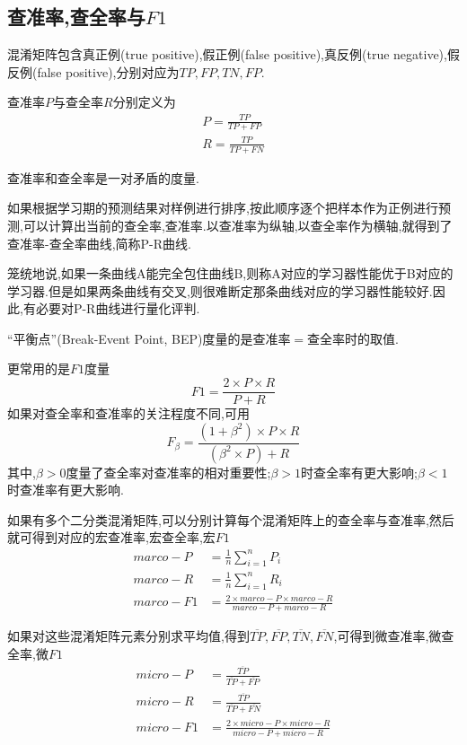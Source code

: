 \subsection{查准率,查全率与$F1$}

混淆矩阵包含真正例(true positive),假正例(false positive),真反例(true negative),假反例(false positive),分别对应为$TP,FP,TN,FP$.

查准率$P$与查全率$R$分别定义为
\begin{equation}\begin{split}
P=\frac{TP}{TP+FP}\\
R=\frac{TP}{TP+FN}
\end{split}\end{equation}

查准率和查全率是一对矛盾的度量.

如果根据学习期的预测结果对样例进行排序,按此顺序逐个把样本作为正例进行预测,可以计算出当前的查全率,查准率.以查准率为纵轴,以查全率作为横轴,就得到了查准率-查全率曲线,简称P-R曲线.

笼统地说,如果一条曲线A能完全包住曲线B,则称A对应的学习器性能优于B对应的学习器.但是如果两条曲线有交叉,则很难断定那条曲线对应的学习器性能较好.因此,有必要对P-R曲线进行量化评判.

``平衡点''(Break-Event Point, BEP)度量的是查准率$=$查全率时的取值.

更常用的是$F1$度量
\begin{equation}
F1=\frac{2\times P\times R}{P+R}
\end{equation}
如果对查全率和查准率的关注程度不同,可用
\begin{equation}
F_\beta=\frac{(1+\beta^2)\times P\times R}{(\beta^2\times P)+R}
\end{equation}
其中,$\beta>0$度量了查全率对查准率的相对重要性;$\beta>1$时查全率有更大影响;$\beta<1$时查准率有更大影响.

如果有多个二分类混淆矩阵,可以分别计算每个混淆矩阵上的查全率与查准率,然后就可得到对应的宏查准率,宏查全率,宏$F1$
\begin{equation}\begin{split}
marco-P&=\frac{1}{n}\sum_{i=1}^nP_i\\
marco-R&=\frac{1}{n}\sum_{i=1}^nR_i\\
marco-F1&=\frac{2\times marco-P \times marco-R}{marco-P+marco-R}
\end{split}\end{equation}

如果对这些混淆矩阵元素分别求平均值,得到$\overline{TP},\overline{FP},\overline{TN},\overline{FN}$,可得到微查准率,微查全率,微$F1$
\begin{equation}\begin{split}
micro-P&=\frac{\overline{TP}}{\overline{TP}+\overline{FP}}\\
micro-R&=\frac{\overline{TP}}{\overline{TP}+\overline{FN}}\\
micro-F1&=\frac{2\times micro-P \times micro-R}{micro-P+micro-R}
\end{split}\end{equation}


